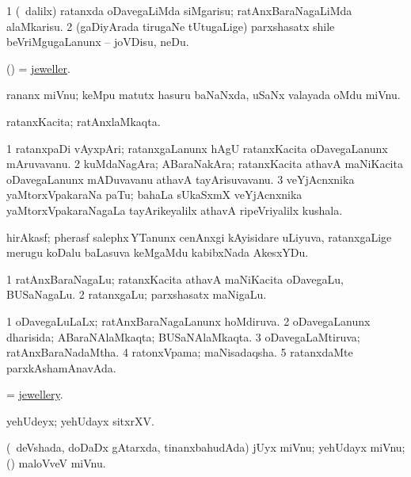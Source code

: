 \bentry
{}
\gl{\sakirx}
\bmng
\bnum
\num{1} (\kanmu\ \BUkaq dalilx) ratanxda oDavegaLiMda siMgarisu; ratAnxBaraNagaLiMda alaMkarisu. 
\num{2} (gaDiyArada tirugaNe tUtugaLige) parxshasatx shile beVriMgugaLanunx -- joVDisu, neDu. 
\enum
\emng
\eentry

\bentry
{}
\gl{\nA}
\bmng
(\ame)  = \hyperlink{jeweller}{jeweller}. 
\emng
\eentry

\bentry
{}
\gl{\nA}
\bmng
rananx miVnu; keMpu matutx hasuru baNaNxda, uSaNx valayada oMdu miVnu. 
\emng
\eentry

\bentry
{}
\gl{\gu}
\bmng
ratanxKacita; ratAnxlaMkaqta. 
\emng
\eentry

\bentry
{}
\gl{\nA}
\bmng
\bnum
\num{1} ratanxpaDi vAyxpAri; ratanxgaLanunx hAgU ratanxKacita oDavegaLanunx mAruvavanu. 
\num{2} kuMdaNagAra; ABaraNakAra; ratanxKacita athavA maNiKacita oDavegaLanunx mADuvavanu athavA tayArisuvavanu. 
\num{3} veYjAcnxnika yaMtorxVpakaraNa paTu; bahaLa sUkaSxmX veYjAcnxnika yaMtorxVpakaraNagaLa tayArikeyalilx athavA ripeVriyalilx kushala. 
\enum
\emng
\eentry

\bentry
{}
\gl{\nA}
\bmng
hirAkasf; pherasf salephx\,YTanunx cenAnxgi kAyisidare uLiyuva, ratanxgaLige merugu koDalu baLasuva keMgaMdu kabibxNada AkesxYDu. 
\emng
\eentry

\bentry
{}
\gl{\nA}
\bmng
\bnum
\num{1} ratAnxBaraNagaLu; ratanxKacita athavA maNiKacita oDavegaLu, BUSaNagaLu. 
\num{2} ratanxgaLu; parxshasatx maNigaLu. 
\enum
\emng
\eentry

\bentry
{}
\gl{\gu}
\bmng
\bnum
\num{1} oDavegaLuLaLx; ratAnxBaraNagaLanunx hoMdiruva. 
\num{2} oDavegaLanunx dharisida; ABaraNAlaMkaqta; BUSaNAlaMkaqta. 
\num{3} oDavegaLaMtiruva; ratAnxBaraNadaMtha. 
\num{4} ratonxVpama; maNisadaqsha. 
\num{5} ratanxdaMte parxkAshamAnavAda. 
\enum
\emng
\eentry

\bentry
{}
\gl{\nA}
\bmng
= \hyperlink{jewellery}{jewellery}. 
\emng
\eentry

\bentry
{}
\gl{\nA}
\bmng
yehUdeyx; yehUdayx sitxrXV. 
\emng
\eentry

\bentry
{}
\gl{\nA}
\bmng
(\AseTxrXV\ deVshada, doDaDx gAtarxda, tinanxbahudAda) jUyx miVnu; yehUdayx miVnu; (\kanmu) maloVveV miVnu. 
\emng
\eentry

